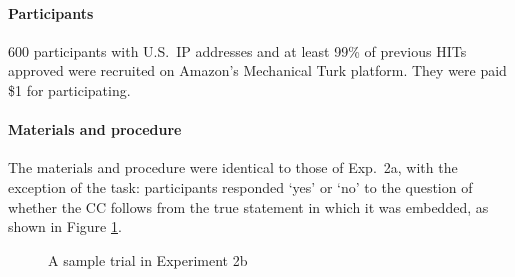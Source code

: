 \documentclass[11pt,fleqn]{article}
\newcommand{\6}{\mbox{$[\hspace*{-.6mm}[$}}
\newcommand{\9}{\mbox{$]\hspace*{-.6mm}]$}}
\begin{document}
\paragraph{Participants} 600 participants with U.S.\ IP addresses and at least 99\% of previous HITs approved were recruited on Amazon's Mechanical Turk platform. They were paid \$1 for participating.

\paragraph{Materials and procedure} The materials and procedure were identical to those of Exp.~2a, with the exception of the task: participants responded `yes' or `no' to the question of whether the CC follows from the true statement in which it was embedded, as shown in Figure \ref{fig-trial-exp2b}.

\begin{figure}[h!]
\begin{center}
\end{center}
\caption{A sample trial in Experiment 2b}\label{fig-trial-exp2b}
\end{figure}
\end{document}
